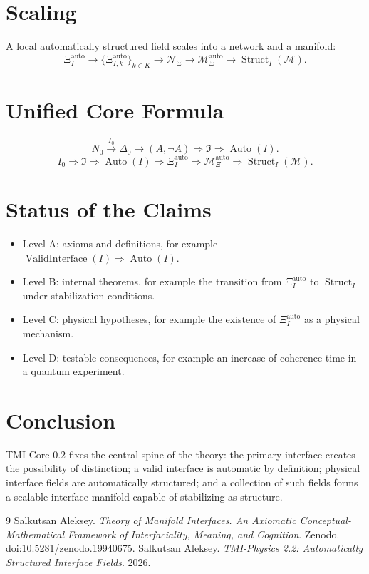 \documentclass[12pt,a4paper]{article}
\DeclareMathOperator{\Valid}{ValidInterface}
\DeclareMathOperator{\Auto}{Auto}
\DeclareMathOperator{\Struct}{Struct}
\newcommand{\M}{\mathcal M}
\newcommand{\Ispace}{\mathfrak I}
\newcommand{\XiAuto}{\Xi_I^{\mathrm{auto}}}
\newcommand{\XiMan}{\mathcal M_{\Xi}^{\mathrm{auto}}}
\newcommand{\NXi}{\mathcal N_{\Xi}}
\begin{document}
\section{Scaling}
A local automatically structured field scales into a network and a manifold:
\begin{equation}
\boxed{\XiAuto\to\{\Xi_{I,k}^{\mathrm{auto}}\}_{k\in K}\to\NXi\to\XiMan\to\Struct_I(\M).}
\end{equation}

\section{Unified Core Formula}
\begin{equation}
\boxed{N_0\xrightarrow{I_0}\Delta_0\to(A,\neg A)\Rightarrow\Ispace\Rightarrow\Auto(I).}
\end{equation}
\begin{equation}
\boxed{I_0\Rightarrow\Ispace\Rightarrow\Auto(I)\Rightarrow\XiAuto\Rightarrow\XiMan\Rightarrow\Struct_I(\M).}
\end{equation}

\section{Status of the Claims}
\begin{itemize}
\item Level A: axioms and definitions, for example \(\Valid(I)\Rightarrow\Auto(I)\).
\item Level B: internal theorems, for example the transition from \(\XiAuto\) to \(\Struct_I\) under stabilization conditions.
\item Level C: physical hypotheses, for example the existence of \(\XiAuto\) as a physical mechanism.
\item Level D: testable consequences, for example an increase of coherence time in a quantum experiment.
\end{itemize}

\section{Conclusion}
TMI-Core 0.2 fixes the central spine of the theory: the primary interface creates the possibility of distinction; a valid interface is automatic by definition; physical interface fields are automatically structured; and a collection of such fields forms a scalable interface manifold capable of stabilizing as structure.

\begin{thebibliography}{9}
 Salkutsan Aleksey. \textit{Theory of Manifold Interfaces. An Axiomatic Conceptual-Mathematical Framework of Interfaciality, Meaning, and Cognition}. Zenodo. \href{https://doi.org/10.5281/zenodo.19940675}{doi:10.5281/zenodo.19940675}.
 Salkutsan Aleksey. \textit{TMI-Physics 2.2: Automatically Structured Interface Fields}. 2026.
\end{thebibliography}
\end{document}

